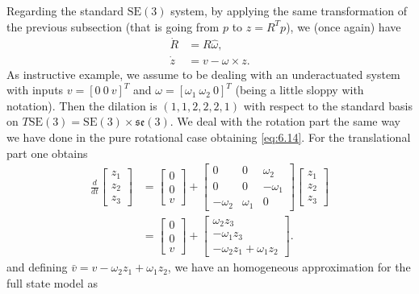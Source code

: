 \documentclass[11pt]{article}
\newcommand{\SE}{\mathrm{SE}}
\newcommand{\se}{\mathfrak{se}}
\begin{document}
Regarding the standard $\SE(3)$ system, by applying the same transformation of the previous subsection (that is going from $p$ to $z=R^Tp$), we (once again) have
\begin{align*}
\dot R &=R\widehat\omega,\\
\dot z &=v-\omega\times z.
\end{align*}
As instructive example, we assume to be dealing with an underactuated system with inputs $v=[0\ 0\ v]^T$ and $\omega=[\omega_1\ \omega_2\ 0]^T$ (being a little sloppy with notation). Then the dilation is $(1,1,2,2,2,1)$ with respect to the standard basis on $T\SE(3)=\SE(3)\times\se(3)$. We deal with the rotation part the same way we have done in the pure rotational case obtaining \eqref{eq:6.14}. For the translational part one obtains
\begin{align*}
\frac{d}{dt}\begin{bmatrix}z_1\\z_2\\z_3\end{bmatrix}
&=\begin{bmatrix}0\\0\\v\end{bmatrix}
+\begin{bmatrix}0&0&\omega_2\\0&0&-\omega_1\\-\omega_2&\omega_1&0\end{bmatrix}
\begin{bmatrix}z_1\\z_2\\z_3\end{bmatrix}\\
&=\begin{bmatrix}0\\0\\v\end{bmatrix}
+\begin{bmatrix}\omega_2z_3\\-\omega_1z_3\\-\omega_2z_1+\omega_1z_2\end{bmatrix}.
\end{align*}
and defining $\bar v=v-\omega_2z_1+\omega_1z_2$, we have an homogeneous approximation for the full state model as
\end{document}
